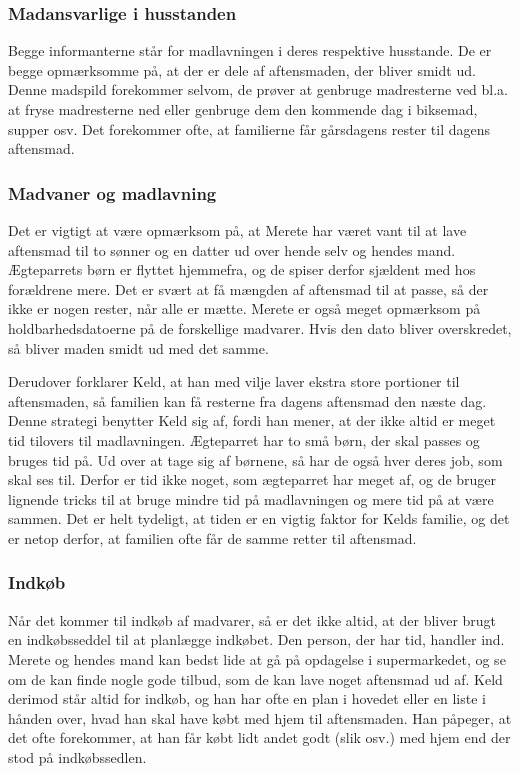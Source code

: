 \subsubsection*{Madansvarlige i husstanden}
Begge informanterne står for madlavningen i deres respektive husstande. De er begge opmærksomme på, at der er dele af aftensmaden, der bliver smidt ud. Denne madspild forekommer selvom, de prøver at genbruge madresterne ved bl.a. at fryse madresterne ned eller genbruge dem den kommende dag i \fx biksemad, supper osv. Det forekommer ofte, at familierne får gårsdagens rester til dagens aftensmad.

\subsubsection*{Madvaner og madlavning}
Det er vigtigt at være opmærksom på, at Merete har været vant til at lave aftensmad til to sønner og en datter ud over hende selv og hendes mand. Ægteparrets børn er flyttet hjemmefra, og de spiser derfor sjældent med hos forældrene mere. Det er svært at få mængden af aftensmad til at passe, så der ikke er nogen rester, når alle er mætte. Merete er også meget opmærksom på holdbarhedsdatoerne på de forskellige madvarer. Hvis den dato bliver overskredet, så bliver maden smidt ud med det samme.

Derudover forklarer Keld, at han med vilje laver ekstra store portioner til aftensmaden, så familien kan få resterne fra dagens aftensmad den næste dag. Denne strategi benytter Keld sig af, fordi han mener, at der ikke altid er meget tid tilovers til madlavningen. Ægteparret har to små børn, der skal passes og bruges tid på. Ud over at tage sig af børnene, så har de også hver deres job, som skal ses til. Derfor er tid ikke noget, som ægteparret har meget af, og de bruger lignende tricks til at bruge mindre tid på madlavningen og mere tid på at være sammen. Det er helt tydeligt, at tiden er en vigtig faktor for Kelds familie, og det er netop derfor, at familien ofte får de samme retter til aftensmad.

\subsubsection*{Indkøb}
Når det kommer til indkøb af madvarer, så er det ikke altid, at der bliver brugt en indkøbsseddel til at planlægge indkøbet. Den person, der har tid, handler ind. Merete og hendes mand kan bedst lide at gå på opdagelse i supermarkedet, og se om de kan finde nogle gode tilbud, som de kan lave noget aftensmad ud af. Keld derimod står altid for indkøb, og han har ofte en plan i hovedet eller en liste i hånden over, hvad han skal have købt med hjem til aftensmaden. Han påpeger, at det ofte forekommer, at han får købt lidt andet godt (slik osv.) med hjem end der stod på indkøbssedlen.


